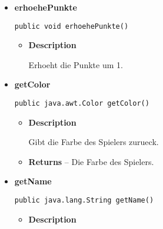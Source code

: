 \documentclass[11pt,a4paper]{report}
\begin{document}
{{{{{{{{{{{\begin{itemize}
{\begin{itemize}
{Ausgelagerte Hilfsmethode fuer die Methode pruefeKasten(). Prueft anhand der uebergebenen Indizes, ob ein Kasten gewonnen wurde.
}
\item{
{\bf  Parameters}
  \begin{itemize}
   \item{
\texttt{k} -- Der Kasten, der geprueft werden soll.}
   \item{
\texttt{pruefListe} -- Die Liste mit den Indizes der Feld, die der Spieler gewonnen hat.}
   \item{
\texttt{x1} -- Index 1}
   \item{
\texttt{x2} -- Index 2}
   \item{
\texttt{x3} -- Index 3}
  \end{itemize}
}%
\item{{\bf  Returns} -- 
true, wenn der Kasten gewonnen wurde. Sonst false. 
}%
\end{itemize}
}%
\item{ 
{\bf  erhoehePunkte}\\
\begin{lstlisting}[frame=none]
public void erhoehePunkte()\end{lstlisting} %
\begin{itemize}
\item{
{\bf  Description}

Erhoeht die Punkte um 1.
}
\end{itemize}
}%
\item{ 
{\bf  getColor}\\
\begin{lstlisting}[frame=none]
public java.awt.Color getColor()\end{lstlisting} %
\begin{itemize}
\item{
{\bf  Description}

Gibt die Farbe des Spielers zurueck.
}
\item{{\bf  Returns} -- 
Die Farbe des Spielers. 
}%
\end{itemize}
}%
\item{ 
{\bf  getName}\\
\begin{lstlisting}[frame=none]
public java.lang.String getName()\end{lstlisting} %
\begin{itemize}
\item{
{\bf  Description}

}
\end{itemize}}
\end{itemize}}}}}}}}}}}}
\end{document}
